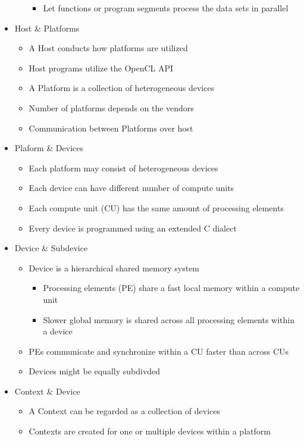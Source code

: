 \documentclass[paper=a4, fontsize=11pt]{scrartcl} %
\numberwithin{equation}{section} %
\numberwithin{figure}{section} %
\numberwithin{table}{section} %
\begin{document}
\begin{itemize}
\begin{itemize}
\begin{itemize}
      \item Let functions or program segments process the data sets in parallel
    \end{itemize}
  \end{itemize}
  \item Host \& Platforms
  \begin{itemize}
    \item A Host conducts how platforms are utilized
    \item Host programs utilize the OpenCL API
    \item A Platform is a collection of heterogeneous devices
    \item Number of platforms depends on the vendors
    \item Communication between Platforms over host
  \end{itemize}
  \item Plaform \& Devices
  \begin{itemize}
    \item Each platform may consist of heterogeneous devices
    \item Each device can have different number of compute units
    \item Each compute unit (CU) has the same amount of processing elements
    \item Every device is programmed using an extended C dialect
  \end{itemize}
  \item Device \& Subdevice
  \begin{itemize}
    \item Device is a hierarchical shared memory system
    \begin{itemize}
      \item Processing elements (PE) share a fast local memory within a compute unit
      \item Slower global memory is shared across all processing elements within a device
    \end{itemize}
    \item PEs communicate and synchronize within a CU faster than across CUs
    \item Devices might be equally subdivded
  \end{itemize}
  \item Context \& Device
  \begin{itemize}
    \item A Context can be regarded as a collection of devices
    \item Contexts are created for one or multiple devices within a platform

\end{itemize}
\end{itemize}
\end{document}
